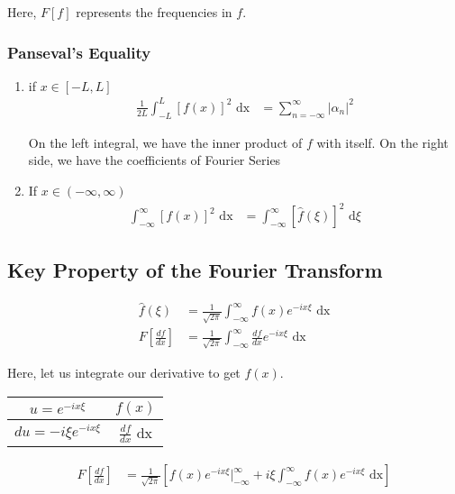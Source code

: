 Here, $F[f]$ represents the frequencies in $f$.

\bigbreak

\subsubsection{Panseval's Equality}
\begin{enumerate}
  \item if $x \in [-L, L]$
  \begin{align}
    \frac{1}{2L} \int^L_{-L} [f(x)]^2 \text{ dx} & = \sum^\infty_{n = -\infty} |\alpha_n|^2
  \end{align}

  On the left integral, we have the inner product of $f$ with itself.
  On the right side, we have the coefficients of Fourier Series
  \item If $x \in (-\infty, \infty)$
  \begin{align}
    \int^\infty_{-\infty} [f(x)]^2 \text{ dx} & = \int^\infty_{-\infty} [\hat f(\xi)]^2 \text{ d}\xi
  \end{align}
\end{enumerate}

\subsection{Key Property of the Fourier Transform}
%
\begin{align}
  \hat f(\xi) & = \frac{1}{\sqrt{2 \pi}} \int^\infty_{-\infty} f(x) e^{-i x \xi} \text{ dx}\\
  F\left[\frac{df}{dx}\right] & = \frac{1}{\sqrt{2 \pi}} \int^\infty_{-\infty} \frac{df}{dx} e^{- i x \xi} \text{ dx}
\end{align}

Here, let us integrate our derivative to get $f(x)$.
\begin{center}
  \begin{tabular}{c|c}
    $u = e^{-i x \xi}$ & $f(x)$\\
    \hline
    $du = -i \xi e^{-i x \xi}$ & $\frac{df}{dx}$ dx
  \end{tabular}
\end{center}

\begin{align}
  F\left[\frac{df}{dx}\right] & = \frac{1}{\sqrt{2 \pi}}
  \left[
  f(x) e^{-i x \xi}\Big|^\infty_{-\infty} + i \xi \int^\infty_{-\infty} f(x) e^{- i x \xi} \text{ dx}
  \right]
\end{align}

